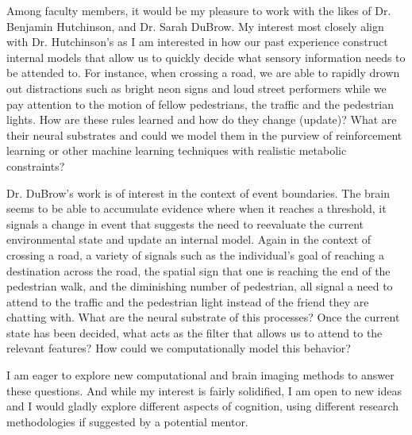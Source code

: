 \documentclass[12pt]{article}
\begin{document}
	Among faculty members, it would be my pleasure to work with the likes of Dr. Benjamin Hutchinson, and Dr. Sarah DuBrow. My interest most closely align with Dr.  Hutchinson’s as I am interested in how our past experience construct internal models that allow us to quickly decide what sensory information needs to be attended to. For instance, when crossing a road, we are able to rapidly drown out distractions such as bright neon signs and loud street performers while we pay attention to the motion of fellow pedestrians, the traffic and the pedestrian lights. How are these rules learned and how do they change (update)? What are their neural substrates and could we model them in the purview of reinforcement learning or other machine learning techniques with realistic metabolic constraints?
	
	Dr. DuBrow’s work is of interest in the context of event boundaries. The brain seems to be able to accumulate evidence where when it reaches a threshold, it signals a change in event that suggests the need to reevaluate the current environmental state and update an internal model. Again in the context of crossing a road, a variety of signals such as the individual’s goal of reaching a destination across the road, the spatial sign that one is reaching the end of the pedestrian walk, and the diminishing number of pedestrian, all signal a need to attend to the traffic and the pedestrian light instead of the friend they are chatting with. What are the neural substrate of this processes? Once the current state has been decided, what acts as the filter that allows us to attend to the relevant features? How could we computationally model this behavior?
	
	I am eager to explore new computational and brain imaging methods to answer these questions. And while my interest is fairly solidified, I am open to new ideas and I would gladly explore different aspects of cognition, using different research methodologies if suggested by a potential mentor.
	
\end{document}
